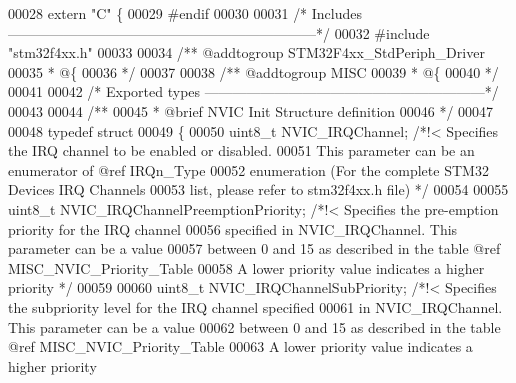 \begin{DoxyCode}
00028  \textcolor{keyword}{extern} \textcolor{stringliteral}{"C"} \{
00029 \textcolor{preprocessor}{#}\textcolor{preprocessor}{endif}
00030 
00031 \textcolor{comment}{/* Includes ------------------------------------------------------------------*/}
00032 \textcolor{preprocessor}{#}\textcolor{preprocessor}{include} "stm32f4xx.h"
00033 
00034 \textcolor{comment}{/** @addtogroup STM32F4xx\_StdPeriph\_Driver}
00035 \textcolor{comment}{  * @\{}
00036 \textcolor{comment}{  */}
00037 
00038 \textcolor{comment}{/** @addtogroup MISC}
00039 \textcolor{comment}{  * @\{}
00040 \textcolor{comment}{  */}
00041 
00042 \textcolor{comment}{/* Exported types ------------------------------------------------------------*/}
00043 
00044 \textcolor{comment}{/** }
00045 \textcolor{comment}{  * @brief  NVIC Init Structure definition  }
00046 \textcolor{comment}{  */}
00047 
00048 \textcolor{keyword}{typedef} \textcolor{keyword}{struct}
00049 \{
00050   uint8\_t NVIC_IRQChannel;                    \textcolor{comment}{/*!< Specifies the IRQ channel to be enabled or
       disabled.}
00051 \textcolor{comment}{                                                   This parameter can be an enumerator of @ref
       IRQn\_Type }
00052 \textcolor{comment}{                                                   enumeration (For the complete STM32 Devices IRQ
       Channels}
00053 \textcolor{comment}{                                                   list, please refer to stm32f4xx.h file) */}
00054 
00055   uint8\_t NVIC_IRQChannelPreemptionPriority;  \textcolor{comment}{/*!< Specifies the pre-emption priority for the IRQ
       channel}
00056 \textcolor{comment}{                                                   specified in NVIC\_IRQChannel. This parameter can be
       a value}
00057 \textcolor{comment}{                                                   between 0 and 15 as described in the table @ref
       MISC\_NVIC\_Priority\_Table}
00058 \textcolor{comment}{                                                   A lower priority value indicates a higher priority
       */}
00059 
00060   uint8\_t NVIC_IRQChannelSubPriority;         \textcolor{comment}{/*!< Specifies the subpriority level for the IRQ channel
       specified}
00061 \textcolor{comment}{                                                   in NVIC\_IRQChannel. This parameter can be a value}
00062 \textcolor{comment}{                                                   between 0 and 15 as described in the table @ref
       MISC\_NVIC\_Priority\_Table}
00063 \textcolor{comment}{                                                   A lower priority value indicates a higher priority
}
\end{DoxyCode}
